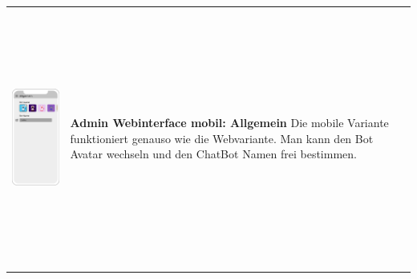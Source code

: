 \begin{tabular}{C{6cm}  L{7cm}}
    \includegraphics[width=5cm,height=8.5cm]{bilder/new vers. UI Design/Allgemein/iPhone X Allgemein III.png} & \textbf{Admin Webinterface mobil: Allgemein} \newline 
    Die mobile Variante funktioniert genauso wie die Webvariante. Man kann den Bot Avatar wechseln und den
    ChatBot Namen frei bestimmen.
\end{tabular}

